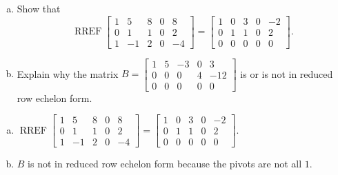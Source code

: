 
\begin{exerciseStatement}

\begin{enumerate}[(a)]
\item Show that \[\operatorname{RREF} \left[\begin{array}{ccccc}
1 & 5 & 8 & 0 & 8 \\
0 & 1 & 1 & 0 & 2 \\
1 & -1 & 2 & 0 & -4
\end{array}\right] = \left[\begin{array}{ccccc}
1 & 0 & 3 & 0 & -2 \\
0 & 1 & 1 & 0 & 2 \\
0 & 0 & 0 & 0 & 0
\end{array}\right] .\]
\item Explain why the matrix \(B= \left[\begin{array}{ccccc}
1 & 5 & -3 & 0 & 3 \\
0 & 0 & 0 & 4 & -12 \\
0 & 0 & 0 & 0 & 0
\end{array}\right] \) is or is not in reduced row echelon form.
\end{enumerate}
    
\end{exerciseStatement}
    
\begin{exerciseAnswer} 

\begin{enumerate}[(a)]
\item \(\operatorname{RREF} \left[\begin{array}{ccccc}
1 & 5 & 8 & 0 & 8 \\
0 & 1 & 1 & 0 & 2 \\
1 & -1 & 2 & 0 & -4
\end{array}\right] = \left[\begin{array}{ccccc}
1 & 0 & 3 & 0 & -2 \\
0 & 1 & 1 & 0 & 2 \\
0 & 0 & 0 & 0 & 0
\end{array}\right] .\)
\item \(B\) is not in reduced row echelon form because the pivots are not all \(1\). 
\end{enumerate}
    
\end{exerciseAnswer}
    
